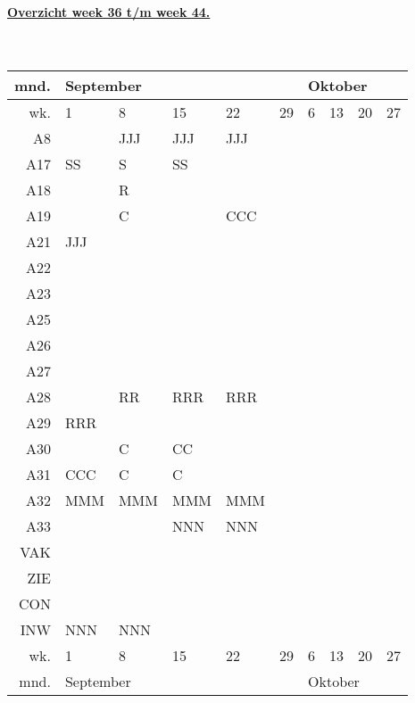 {\bf
\underline{Overzicht week 36 t/m week 44.}\\ \\ \\
\small
\begin{tabular}{||r||p{3em}|p{3em}|p{3em}|p{3em}|p{3em}||p{3em}|p{3em}|p{3em}|p{3em}||} \hline 
mnd.&\multicolumn{5}{l||}{September}&\multicolumn{4}{l||}{Oktober} \\ \hline 
wk.&  1&8  &15 &22 &29 &6  &13 &20 &27 \\ \hline \hline
 A8&   &JJJ&JJJ&JJJ&   &   &   &   &   \\ \hline
A17&SS &S  &SS &   &   &   &   &   &   \\ \hline
A18&   &R  &   &   &   &   &   &   &   \\ \hline
A19&   &C  &   &CCC&   &   &   &   &   \\ \hline
A21&JJJ&   &   &   &   &   &   &   &   \\ \hline
A22&   &   &   &   &   &   &   &   &   \\ \hline
A23&   &   &   &   &   &   &   &   &   \\ \hline
A25&   &   &   &   &   &   &   &   &   \\ \hline
A26&   &   &   &   &   &   &   &   &   \\ \hline
A27&   &   &   &   &   &   &   &   &   \\ \hline
A28&   &RR &RRR&RRR&   &   &   &   &   \\ \hline
A29&RRR&   &   &   &   &   &   &   &   \\ \hline
A30&   &C  &CC &   &   &   &   &   &   \\ \hline
A31&CCC&C  &C  &   &   &   &   &   &   \\ \hline
A32&MMM&MMM&MMM&MMM&   &   &   &   &   \\ \hline
A33&   &   &NNN&NNN&   &   &   &   &   \\ \hline
VAK&   &   &   &   &   &   &   &   &   \\ \hline
ZIE&   &   &   &   &   &   &   &   &   \\ \hline
CON&   &   &   &   &   &   &   &   &   \\ \hline
INW&NNN&NNN&   &   &   &   &   &   &   \\ \hline \hline
wk.&1  &8  &15 &22 &29 &6  &13 &20 &27 \\ \hline
mnd.&\multicolumn{5}{l||}{September}&\multicolumn{4}{l||}{Oktober} \\ \hline
\end{tabular}
\rm
\hspace{10mm}\\ \\ 
}
